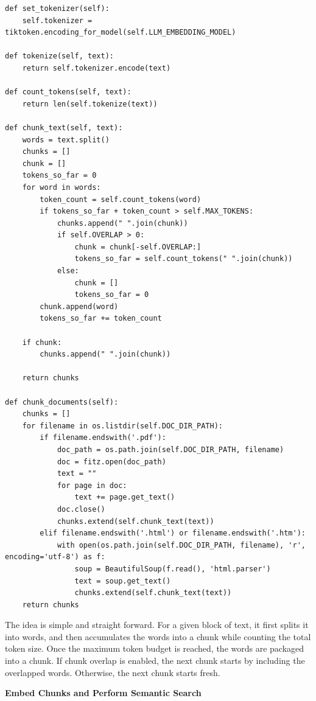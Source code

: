 \begin{lstlisting}
def set_tokenizer(self):
    self.tokenizer = tiktoken.encoding_for_model(self.LLM_EMBEDDING_MODEL)

def tokenize(self, text):
    return self.tokenizer.encode(text)

def count_tokens(self, text):
    return len(self.tokenize(text))

def chunk_text(self, text):
    words = text.split()
    chunks = []
    chunk = []
    tokens_so_far = 0
    for word in words:
        token_count = self.count_tokens(word)
        if tokens_so_far + token_count > self.MAX_TOKENS:
            chunks.append(" ".join(chunk))
            if self.OVERLAP > 0:
                chunk = chunk[-self.OVERLAP:]
                tokens_so_far = self.count_tokens(" ".join(chunk))
            else:
                chunk = []
                tokens_so_far = 0
        chunk.append(word)
        tokens_so_far += token_count

    if chunk:
        chunks.append(" ".join(chunk))

    return chunks

def chunk_documents(self):
    chunks = []
    for filename in os.listdir(self.DOC_DIR_PATH):
        if filename.endswith('.pdf'):
            doc_path = os.path.join(self.DOC_DIR_PATH, filename)
            doc = fitz.open(doc_path)
            text = ""
            for page in doc:
                text += page.get_text()
            doc.close()
            chunks.extend(self.chunk_text(text))
        elif filename.endswith('.html') or filename.endswith('.htm'):
            with open(os.path.join(self.DOC_DIR_PATH, filename), 'r', encoding='utf-8') as f:
                soup = BeautifulSoup(f.read(), 'html.parser')
                text = soup.get_text()
                chunks.extend(self.chunk_text(text))
    return chunks
\end{lstlisting}

The idea is simple and straight forward. For a given block of text, it first splits it into words, and then accumulates the words into a chunk while counting the total token size. Once the maximum token budget is reached, the words are packaged into a chunk. If chunk overlap is enabled, the next chunk starts by including the overlapped words. Otherwise, the next chunk starts fresh.

\vspace{0.1in}
\noindent \textbf{Embed Chunks and Perform Semantic Search}
\vspace{0.1in}

